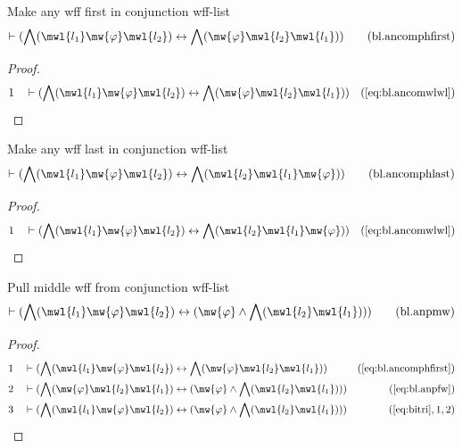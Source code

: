 \begin{lemma} {Make any wff first in conjunction
wff-list}
\begin{align}
\vdash ( \bigwedge( \mwl{l_1} \mw{\varphi} \mwl{l_2} ) \leftrightarrow
    \bigwedge( \mw{\varphi} \mwl{l_2} \mwl{l_1} )
    )\label{eq:bl.ancomphfirst}\tag{bl.ancomphfirst}
\end{align}
\end{lemma}


\begin{proof}
\begin{align}
  1 &&  & \vdash ( \bigwedge( \mwl{l_1} \mw{\varphi} \mwl{l_2} )
     \leftrightarrow \bigwedge( \mw{\varphi} \mwl{l_2}
     \mwl{l_1} ) )&(\mbox{\ref{eq:bl.ancomwlwl}})\notag
\end{align}
\end{proof}

\begin{lemma} {Make any wff last in conjunction
wff-list}
\begin{align}
\vdash ( \bigwedge( \mwl{l_1} \mw{\varphi} \mwl{l_2} ) \leftrightarrow
    \bigwedge( \mwl{l_2} \mwl{l_1} \mw{\varphi} )
    )\label{eq:bl.ancomphlast}\tag{bl.ancomphlast}
\end{align}
\end{lemma}


\begin{proof}
\begin{align}
  1 &&  & \vdash ( \bigwedge( \mwl{l_1} \mw{\varphi} \mwl{l_2} )
     \leftrightarrow \bigwedge( \mwl{l_2} \mwl{l_1}
     \mw{\varphi} ) )&(\mbox{\ref{eq:bl.ancomwlwl}})\notag
\end{align}
\end{proof}

\begin{lemma} {Pull middle wff from conjunction wff-list}
\begin{align}
\vdash ( \bigwedge( \mwl{l_1} \mw{\varphi} \mwl{l_2} ) \leftrightarrow (
    \mw{\varphi} \wedge \bigwedge( \mwl{l_2} \mwl{l_1} ) )
    )\label{eq:bl.anpmw}\tag{bl.anpmw}
\end{align}
\end{lemma}


\begin{proof}
\begin{align}
  1 &&  & \vdash ( \bigwedge( \mwl{l_1} \mw{\varphi} \mwl{l_2} )
     \leftrightarrow \bigwedge( \mw{\varphi} \mwl{l_2}
     \mwl{l_1} ) )&(\mbox{\ref{eq:bl.ancomphfirst}})\notag
  \\ 2 &&  & \vdash ( \bigwedge( \mw{\varphi} \mwl{l_2} \mwl{l_1} )
     \leftrightarrow ( \mw{\varphi} \wedge \bigwedge(
     \mwl{l_2} \mwl{l_1} ) )
     )&(\mbox{\ref{eq:bl.anpfw}})\notag
  \\ 3 &&  & \vdash ( \bigwedge( \mwl{l_1} \mw{\varphi} \mwl{l_2} )
     \leftrightarrow ( \mw{\varphi} \wedge \bigwedge(
     \mwl{l_2} \mwl{l_1} ) )
     )&(\mbox{\ref{eq:bitri}},1,2)\notag
\end{align}
\end{proof}

